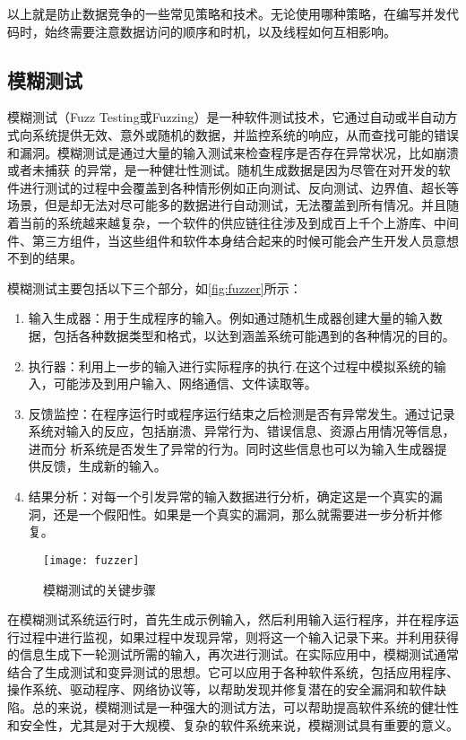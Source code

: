 以上就是防止数据竞争的一些常见策略和技术。无论使用哪种策略，在编写并发代码时，始终需要注意数据访问的顺序和时机，以及线程如何互相影响。

\subsection{模糊测试}

模糊测试\cite{sutton2007fuzzing, manes2018fuzzing}（Fuzz Testing或Fuzzing）是一种软件测试技术，它通过自动或半自动方式向系统提供无效、意外或随机的数据，并监控系统的响应，从而查找可能的错误和漏洞。模糊测试是通过大量的输入测试来检查程序是否存在异常状况，比如崩溃或者未捕获 的异常，是一种健壮性测试。随机生成数据是因为尽管在对开发的软件进行测试的过程中会覆盖到各种情形例如正向测试、反向测试、边界值、超长等场景，但是却无法对尽可能多的数据进行自动测试，无法覆盖到所有情况。并且随着当前的系统越来越复杂，一个软件的供应链往往涉及到成百上千个上游库、中间件、第三方组件，当这些组件和软件本身结合起来的时候可能会产生开发人员意想不到的结果。

模糊测试主要包括以下三个部分，如\autoref{fig:fuzzer}所示：

\begin{enumerate}
\item 输入生成器：用于生成程序的输入。例如通过随机生成器创建大量的输入数据，包括各种数据类型和格式，以达到涵盖系统可能遇到的各种情况的目的。
\item 执行器：利用上一步的输入进行实际程序的执行.在这个过程中模拟系统的输入，可能涉及到用户输入、网络通信、文件读取等。
\item 反馈监控：在程序运行时或程序运行结束之后检测是否有异常发生。通过记录系统对输入的反应，包括崩溃、异常行为、错误信息、资源占用情况等信息，进而分 析系统是否发生了异常的行为。同时这些信息也可以为输入生成器提供反馈，生成新的输入。
\item 结果分析：对每一个引发异常的输入数据进行分析，确定这是一个真实的漏洞，还是一个假阳性。如果是一个真实的漏洞，那么就需要进一步分析并修复。
\end{enumerate}

\begin{figure}[ht]
    \centering
    \texttt{[image: fuzzer]}
    \caption{\label{fig:fuzzer}模糊测试的关键步骤\cite{zhu2022fuzzing}}
\end{figure}


在模糊测试系统运行时，首先生成示例输入，然后利用输入运行程序，并在程序运行过程中进行监视，如果过程中发现异常，则将这一个输入记录下来。并利用获得的信息生成下一轮测试所需的输入，再次进行测试。在实际应用中，模糊测试通常结合了生成测试和变异测试的思想。它可以应用于各种软件系统，包括应用程序、操作系统、驱动程序、网络协议等，以帮助发现并修复潜在的安全漏洞和软件缺陷。总的来说，模糊测试是一种强大的测试方法，可以帮助提高软件系统的健壮性和安全性，尤其是对于大规模、复杂的软件系统来说，模糊测试具有重要的意义。

